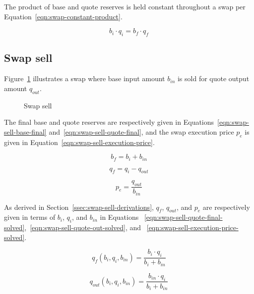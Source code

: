 \documentclass[table, twocolumn]{article}
\begin{document}
The product of base and quote reserves is held constant throughout a swap per
Equation~\ref{eqn:swap-constant-product}.

\begin{equation}\label{eqn:swap-constant-product}
	b_i \cdot q_i = b_f \cdot q_f
\end{equation}

\subsection{Swap sell}\label{ssec:swap-sell}

Figure~\ref{fig:swap-sell} illustrates a swap where base input amount $b_{in}$ is sold
for quote output amount $q_{out}$.

\begin{figure}[!htb]
	\centering
	
	\caption{Swap sell}\label{fig:swap-sell}
\end{figure}

The final base and quote reserves are respectively given in
Equations~\ref{eqn:swap-sell-base-final} and~\ref{eqn:swap-sell-quote-final}, and the
swap execution price $p_e$ is given in Equation~\ref{eqn:swap-sell-execution-price}.

\begin{equation}\label{eqn:swap-sell-base-final}
	b_f = b_i + b_{in}
\end{equation}

\begin{equation}\label{eqn:swap-sell-quote-final}
	q_f = q_i - q_{out}
\end{equation}

\begin{equation}\label{eqn:swap-sell-execution-price}
	p_e = \frac{q_{out}}{b_{in}}
\end{equation}

As derived in Section~\ref{ssec:swap-sell-derivations}, $q_f$, $q_{out}$, and $p_e$ are
respectively given in terms of $b_i$, $q_i$, and $b_{in}$ in Equations%
~\ref{eqn:swap-sell-quote-final-solved},~\ref{eqn:swap-sell-quote-out-solved}, and%
~\ref{eqn:swap-sell-execution-price-solved}.

\begin{equation}\label{eqn:swap-sell-quote-final-solved}
	q_f(b_i, q_i, b_{in}) = \frac{b_i \cdot q_i}{b_i + b_{in}}
\end{equation}

\begin{equation}\label{eqn:swap-sell-quote-out-solved}
	q_{out} (b_i, q_i, b_{in}) = \frac{b_{in} \cdot q_i}{b_i + b_{in}}
\end{equation}
\end{document}
